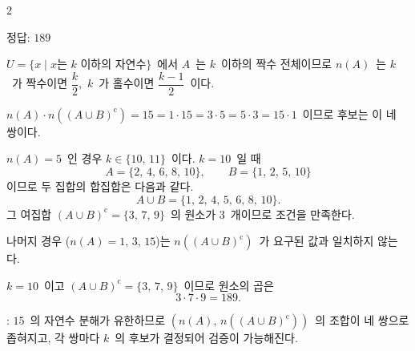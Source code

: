 \documentclass[10pt,fleqn]{article}
\begin{document}
\begin{multicols*}{2}
\begin{dmanswerbox}
정답: $189$
\end{dmanswerbox}

$U=\{x\mid x\text{는 }k\text{ 이하의 자연수}\}$\ 에서 $A$\ 는 $k$\ 이하의 짝수 전체이므로 $n(A)$\ 는 $k$\ 가 짝수이면 $\dfrac{k}{2}$,\ $k$\ 가 홀수이면 $\dfrac{k-1}{2}$\ 이다.

$n(A)\cdot n((A\cup B)^{\mathrm{c}})=15=1\cdot 15=3\cdot 5=5\cdot 3=15\cdot 1$\ 이므로 후보는 이 네 쌍이다.

$n(A)=5$\ 인 경우 $k\in\{10,\,11\}$\ 이다. $k=10$\ 일 때
\[ A=\{2,\,4,\,6,\,8,\,10\},\qquad B=\{1,\,2,\,5,\,10\} \]
이므로 두 집합의 합집합은 다음과 같다.
\[ A\cup B=\{1,\,2,\,4,\,5,\,6,\,8,\,10\}. \]
그 여집합 $(A\cup B)^{\mathrm{c}}=\{3,\,7,\,9\}$\ 의 원소가 $3$\ 개이므로 조건을 만족한다.

나머지 경우 ($n(A)=1,\,3,\,15$)는 $n((A\cup B)^{\mathrm{c}})$\ 가 요구된 값과 일치하지 않는다.

$k=10$\ 이고 $(A\cup B)^{\mathrm{c}}=\{3,\,7,\,9\}$\ 이므로 원소의 곱은
\[ 3\cdot 7\cdot 9=189. \]

\begin{dmcriticalpoint}
: $15$\ 의 자연수 분해가 유한하므로 $(n(A),\,n((A\cup B)^{\mathrm{c}}))$\ 의 조합이 네 쌍으로 좁혀지고, 각 쌍마다 $k$\ 의 후보가 결정되어 검증이 가능해진다.
\end{dmcriticalpoint}

\end{multicols*}
\end{document}
